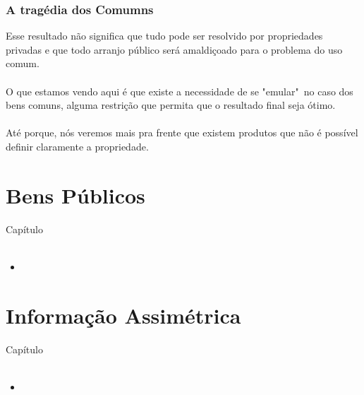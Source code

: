 \documentclass{beamer}[10]
\begin{document}
\begin{frame}
	\frametitle{A tragédia dos Comumns}

	Esse resultado não significa que tudo pode ser resolvido por propriedades privadas e que todo arranjo público será amaldiçoado para o problema do uso comum.
	\\~\\
	O que estamos vendo aqui é que existe a necessidade de se "emular"\ no caso dos bens comuns, alguma restrição que permita que o resultado final seja ótimo.
	\\~\\
	Até porque, nós veremos mais pra frente que existem produtos que não é possível definir claramente a propriedade.

\end{frame}

\section[B.Públicos]{Bens Públicos}
\begin{frame}
	\huge Capítulo \normalsize
	\\~\\
	\begin{multicols*}{2}		
		\begin{itemize}
			\item 
		\end{itemize}
	\end{multicols*}
\end{frame}


\begin{frame}
	\frametitle{}

	

\end{frame}

\section[I.Assimétrica]{Informação Assimétrica}
\begin{frame}
	\huge Capítulo \normalsize
	\\~\\
	\begin{multicols*}{2}		
		\begin{itemize}
			\item 
		\end{itemize}
	\end{multicols*}
\end{frame}


\begin{frame}
	\frametitle{}

	

\end{frame}
\end{document}
